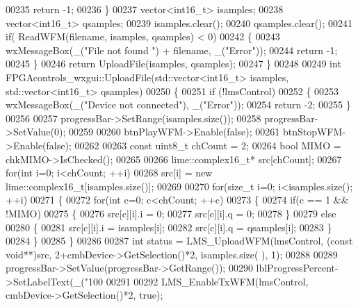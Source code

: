 \begin{DoxyCode}
{00235         \textcolor{keywordflow}{return} -1;
00236     \}
00237     vector<int16\_t> isamples;
00238     vector<int16\_t> qsamples;
00239     isamples.clear();
00240     qsamples.clear();
00241     \textcolor{keywordflow}{if}( ReadWFM(filename, isamples, qsamples) < 0)
00242     \{
00243         wxMessageBox(\_(\textcolor{stringliteral}{"File not found "}) + filename, \_(\textcolor{stringliteral}{"Error"}));
00244         \textcolor{keywordflow}{return} -1;
00245     \}
00246     \textcolor{keywordflow}{return} UploadFile(isamples, qsamples);
00247 \}
00248 
00249 \textcolor{keywordtype}{int} FPGAcontrols_wxgui::UploadFile(std::vector<int16\_t> isamples, std::vector<int16\_t> qsamples)
00250 \{
00251     \textcolor{keywordflow}{if} (!lmsControl)
00252     \{
00253         wxMessageBox(\_(\textcolor{stringliteral}{"Device not connected"}), \_(\textcolor{stringliteral}{"Error"}));
00254         \textcolor{keywordflow}{return} -2;
00255     \}
00256 
00257     progressBar->SetRange(isamples.size());
00258     progressBar->SetValue(0);
00259 
00260     btnPlayWFM->Enable(\textcolor{keyword}{false});
00261     btnStopWFM->Enable(\textcolor{keyword}{false});
00262 
00263     \textcolor{keyword}{const} uint8\_t chCount = 2;
00264     \textcolor{keywordtype}{bool} MIMO = chkMIMO->IsChecked();
00265 
00266     lime::complex16_t* src[chCount];
00267     \textcolor{keywordflow}{for}(\textcolor{keywordtype}{int} i=0; i<chCount; ++i)
00268         src[i] = \textcolor{keyword}{new} lime::complex16_t[isamples.size()];
00269 
00270     \textcolor{keywordflow}{for}(\textcolor{keywordtype}{size\_t} i=0; i<isamples.size(); ++i)
00271     \{
00272         \textcolor{keywordflow}{for}(\textcolor{keywordtype}{int} c=0; c<chCount; ++c)
00273         \{
00274             \textcolor{keywordflow}{if}(c == 1 && !MIMO)
00275             \{
00276                 src[c][i].i = 0;
00277                 src[c][i].q = 0;
00278             \}
00279             \textcolor{keywordflow}{else}
00280             \{
00281                 src[c][i].i = isamples[i];
00282                 src[c][i].q = qsamples[i];
00283             \}
00284         \}
00285     \}
00286 
00287     \textcolor{keywordtype}{int} status = LMS_UploadWFM(lmsControl, (\textcolor{keyword}{const} \textcolor{keywordtype}{void}**)src, 2+cmbDevice->GetSelection()*2, isamples.size(
      ), 1);
00288 
00289     progressBar->SetValue(progressBar->GetRange());
00290     lblProgressPercent->SetLabelText(\_(\textcolor{stringliteral}{"100%
00291 
00292     LMS_EnableTxWFM(lmsControl, cmbDevice->GetSelection()*2, \textcolor{keyword}{true});
}}
\end{DoxyCode}
